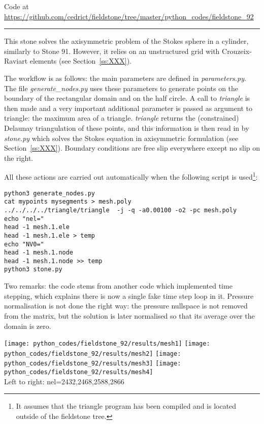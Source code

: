 

\begin{center}
Code at \url{https://github.com/cedrict/fieldstone/tree/master/python_codes/fieldstone_92}
\end{center}

\par\noindent\rule{\textwidth}{0.4pt}



This stone solves the axisymmetric problem of the Stokes sphere in a cylinder, 
similarly to Stone 91. However, it relies on an unstructured grid with 
Crouzeix-Raviart elements (see Section~\ref{ss:XXX}).

The workflow is as follows: the main parameters are defined in {\sl parameters.py}.
The file {\sl generate\_nodes.py} uses these parameters to generate points on the 
boundary of the rectangular domain and on the half circle. 
A call to {\sl triangle} is then made and a very important additional parameter is passed
as argument to triangle: the maximum area of a triangle. 
{\sl triangle} returns the (constrained) Delaunay triangulation of these points, 
and this information is then read in by {\sl stone.py} which solves the 
Stokes equation in axisymmetric formulation (see Section~\ref{ss:XXX}). 
Boundary conditions are free slip everywhere except no slip on the right. 

All these actions are carried out automatically when the following script is 
used\footnote{It assumes that the triangle program has been compiled and 
is located outside of the fieldstone tree.}:
\begin{lstlisting}
python3 generate_nodes.py
cat mypoints mysegments > mesh.poly
../../../../triangle/triangle  -j -q -a0.00100 -o2 -pc mesh.poly
echo "nel="
head -1 mesh.1.ele 
head -1 mesh.1.ele > temp
echo "NV0="
head -1 mesh.1.node 
head -1 mesh.1.node >> temp
python3 stone.py
\end{lstlisting}

Two remarks: the code stems from another code which implemented time stepping, 
which explains there is now a single fake time step loop in it. 
Pressure normalisation is not done the right way: the pressure nullspace is 
not removed from the matrix, but the solution is later normalised so that 
its average over the domain is zero.

\begin{center}
\texttt{[image: python\_codes/fieldstone\_92/results/mesh1]}
\texttt{[image: python\_codes/fieldstone\_92/results/mesh2]}
\texttt{[image: python\_codes/fieldstone\_92/results/mesh3]}
\texttt{[image: python\_codes/fieldstone\_92/results/mesh4]}\\
{\captionfont Left to right: nel=2432,2468,2588,2866}
\end{center}


